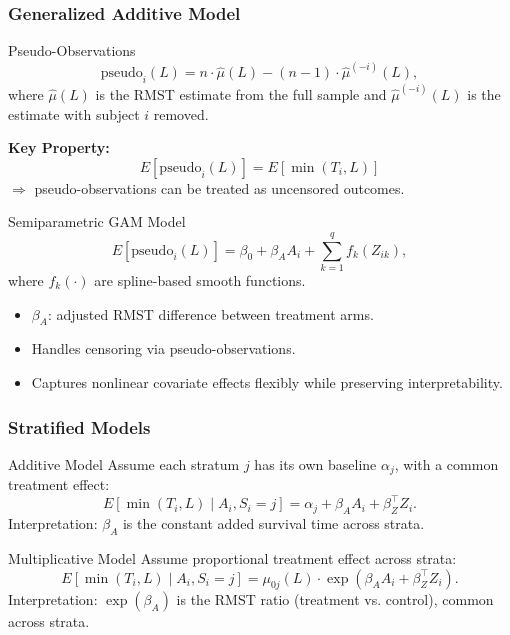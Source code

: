 \documentclass{beamer}
\begin{document}
\begin{frame}
\frametitle{Generalized Additive Model \citep{parner2010}}

\begin{block}{Pseudo-Observations}
\[
\text{pseudo}_i(L) = n \cdot \widehat{\mu}(L) - (n-1)\cdot \widehat{\mu}^{(-i)}(L),
\]
\scriptsize
where $\widehat{\mu}(L)$ is the RMST estimate from the full sample and  
$\widehat{\mu}^{(-i)}(L)$ is the estimate with subject $i$ removed.  

\textbf{Key Property:}  
\[
E[\text{pseudo}_i(L)] = E[\min(T_i,L)]
\]
$\Rightarrow$ pseudo-observations can be treated as uncensored outcomes.
\end{block}

\begin{block}{Semiparametric GAM Model}
\[
E[\text{pseudo}_i(L)] = \beta_0 + \beta_A A_i + \sum_{k=1}^q f_k(Z_{ik}),
\]
\scriptsize
where $f_k(\cdot)$ are spline-based smooth functions.

\begin{itemize}
  \item $\beta_A$: adjusted RMST difference between treatment arms.  
  \item Handles censoring via pseudo-observations.  
  \item Captures nonlinear covariate effects flexibly while preserving interpretability.  
\end{itemize}
\end{block}
\end{frame}

\begin{frame}
\frametitle{Stratified Models \citep{royston2011}}

\begin{block}{Additive Model}
Assume each stratum $j$ has its own baseline $\alpha_j$, with a common treatment effect:
\[
E[\min(T_i,L) \mid A_i, S_i=j] = \alpha_j + \beta_A A_i + \beta_Z^\top Z_i.
\]
Interpretation: $\beta_A$ is the constant added survival time across strata.
\end{block}

\begin{block}{Multiplicative Model}
Assume proportional treatment effect across strata:
\[
E[\min(T_i,L) \mid A_i, S_i=j] = \mu_{0j}(L) \cdot \exp(\beta_A A_i + \beta_Z^\top Z_i).
\]
Interpretation: $\exp(\beta_A)$ is the RMST ratio (treatment vs. control), common across strata.
\end{block}

\end{frame}
\end{document}
